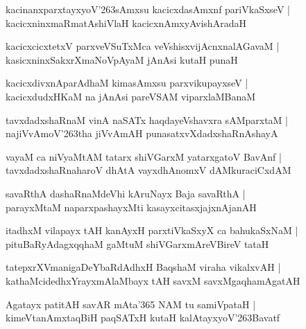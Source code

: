 \documentclass[twoside,12pt,openright]{book}
\def\S{\char'263}
\newcounter{shloka}[chapter]
\begin{document}
\begin{shloka}
kacinanxparxtayxyoV\S sAmxsu kacicxdasAmxnf pariVkaSxseV |\\
kacicxninxmaRmatAshiVlaH kacicxnAmxyAvishAradaH
\end{shloka}

\begin{shloka}
kacicxcicxtetxV parxveVSuTxMca veVshisxvijAcnxnalAGavaM |\\
kasicxninxSakxrXmaNoVpAyaM jAnAsi kutaH punaH 
\end{shloka}

\begin{shloka}
kacicxdivxnAparAdhaM kimasAmxsu parxvikupayxseV |\\
kacicxdudxHKaM na jAnAsi pareVSAM viparxlaMBanaM
\end{shloka}

\begin{shloka}
tavxdadxshaRnaM vinA naSATx haqdayeVshavxra sAMparxtaM |\\
najiVvAmoV\S tha jiVvAmAH punasatxvXdadxshaRnAshayA
\end{shloka}

\begin{shloka}
vayaM ca niVyaMtAM tatarx shiVGarxM yatarxgatoV BavAnf |\\
tavxdadxshaRnaharoV dhAtA vayxdhAnomxV dAMkuraciCxdAM 
\end{shloka}

\begin{shloka}
savaRthA dashaRnaMdeVhi kAruNayx Baja savaRthA |\\
parayxMtaM naparxpashayxMti kasayxcitasxjajxnAjanAH 
\end{shloka}

\begin{shloka}
itadhxM vilapayx tAH kanAyxH parxtiVkaSxyX ca bahukaSxNaM |\\
pituBaRyAdagxqqhaM gaMtuM shiVGarxmAreVBireV tataH 
\end{shloka}

\begin{shloka}
tatepxrXVmanigaDeYbaRdAdhxH BaqshaM viraha vikalxvAH |\\
kathaMcidedhxYrayxmAlaMbayx tAH savxM savxMgaqhamAgatAH
\end{shloka}

\begin{shloka}
Agatayx patitAH savAR mAta\char'365 NAM tu samiVpataH |\\
kimeVtanAmxtaqBiH paqSATxH kutaH kalAtayxyoV\S Bavatf
\end{shloka}
\end{document}
